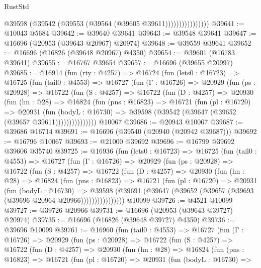 \begin{lexlean}{RustStd}
\begin{coremodule}
                          @39598 (@39542 (@39553 (@39564 (@39605 @39611))))))))))))))))
@39641 := @10043 @5684
@39642 := @39640 @39641
@39643 := @39548 @39641
@39647 := @16696 (@20953 (@39643 @20967) @20974)
@39648 := @39559 @39641
@39652 := @16696 (@16826 (@39648 @20967) @4350)
@39654 := @39601 (@16783 @39641)
@39655 := @16767 @39654
@39657 := @16696 (@39655 @20997)
@39685 := @16914
    (fun (rty : @4257) =>
    @16724
      (fun (lets0 : @16723) =>
      @16725
        (fun (tail0 : @4553) =>
        @16727
          (fun (Γ : @16726) =>
          @20929
            (fun (ps : @20928) =>
            @16722
              (fun (S : @4257) =>
              @16722
                (fun (D : @4257) =>
                @20930
                  (fun (hn : @28) =>
                  @16824
                    (fun (pns : @16823) =>
                    @16721
                      (fun (pl : @16720) =>
                      @20931
                        (fun (bodyL : @16730) =>
                        @39598 (@39542 (@39647 (@39652 (@39657 @39611)))))))))))))))
    @10067
@39686 := @20943 @10067
@39687 := @39686 @16714
@39691 := @16696 (@39540 (@20940 (@20942 @39687)))
@39692 := @16796 @10067
@39693 := @21000 @39692
@39696 := @16799 @39692 @39606 @35740
@39725 := @16936
    (fun (lets0 : @16723) =>
    @16725
      (fun (tail0 : @4553) =>
      @16727
        (fun (Γ : @16726) =>
        @20929
          (fun (ps : @20928) =>
          @16722
            (fun (S : @4257) =>
            @16722
              (fun (D : @4257) =>
              @20930
                (fun (hn : @28) =>
                @16824
                  (fun (pns : @16823) =>
                  @16721
                    (fun (pl : @16720) =>
                    @20931
                      (fun (bodyL : @16730) =>
                      @39598
                        (@39691
                          (@39647 (@39652 (@39657 (@39693 (@39696 @20964 @20966))))))))))))))))
    @10099
@39726 := @4521 @10099
@39727 := @39726 @20966
@39731 := @16696 (@20953 (@39643 @39727) @20974)
@39735 := @16696 (@16826 (@39648 @39727) @4350)
@39736 := @39696 @10099
@39761 := @16960
    (fun (tail0 : @4553) =>
    @16727
      (fun (Γ : @16726) =>
      @20929
        (fun (ps : @20928) =>
        @16722
          (fun (S : @4257) =>
          @16722
            (fun (D : @4257) =>
            @20930
              (fun (hn : @28) =>
              @16824
                (fun (pns : @16823) =>
                @16721
                  (fun (pl : @16720) =>
                  @20931
                    (fun (bodyL : @16730) =>

\end{coremodule}
\end{lexlean}
